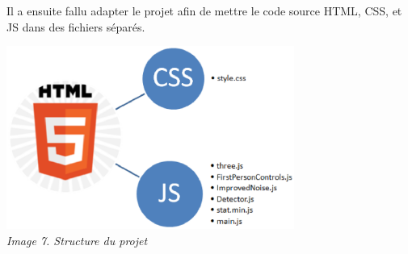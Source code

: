 Il a ensuite fallu adapter le projet afin de mettre le code source HTML, CSS, et JS dans des fichiers séparés.

\begin{center}
	\includegraphics[height=6cm]{images/ProFileOrganisation.eps}\\
	\textit{Image 7. Structure du projet}
\end{center}